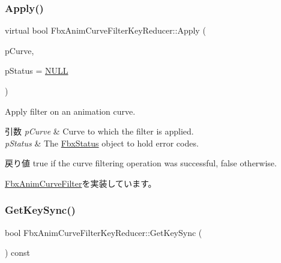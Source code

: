 \subsubsection{\texorpdfstring{Apply()}{Apply()}\hspace{0.1cm}{\footnotesize\ttfamily [5/5]}}
{\footnotesize\ttfamily virtual bool Fbx\+Anim\+Curve\+Filter\+Key\+Reducer\+::\+Apply (\begin{DoxyParamCaption}\item[{\hyperlink{class_fbx_anim_curve}{Fbx\+Anim\+Curve} \&}]{p\+Curve,  }\item[{\hyperlink{class_fbx_status}{Fbx\+Status} $\ast$}]{p\+Status = {\ttfamily \hyperlink{fbxarch_8h_a070d2ce7b6bb7e5c05602aa8c308d0c4}{N\+U\+LL}} }\end{DoxyParamCaption})\hspace{0.3cm}{\ttfamily [virtual]}}

Apply filter on an animation curve. 
\begin{DoxyParams}{引数}
{\em p\+Curve} & Curve to which the filter is applied. \\
\hline
{\em p\+Status} & The \hyperlink{class_fbx_status}{Fbx\+Status} object to hold error codes. \\
\hline
\end{DoxyParams}
\begin{DoxyReturn}{戻り値}
{\ttfamily true} if the curve filtering operation was successful, {\ttfamily false} otherwise. 
\end{DoxyReturn}


\hyperlink{class_fbx_anim_curve_filter_a6a69996c47c0e6f63a0f8b0d5fa806a0}{Fbx\+Anim\+Curve\+Filter}を実装しています。

\mbox{\label{class_fbx_anim_curve_filter_key_reducer_a82cb456079577735e58cba071eed3a12}} 
\subsubsection{\texorpdfstring{Get\+Key\+Sync()}{GetKeySync()}}
{\footnotesize\ttfamily bool Fbx\+Anim\+Curve\+Filter\+Key\+Reducer\+::\+Get\+Key\+Sync (\begin{DoxyParamCaption}{ }\end{DoxyParamCaption}) const}



